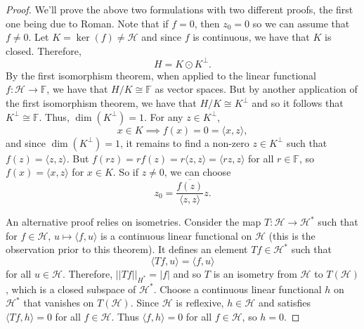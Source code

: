 \documentclass[psamsfonts]{amsart}
\theoremstyle{definition}
\theoremstyle{remark}
\numberwithin{equation}{section}
\begin{document}
\begin{proof}
We'll prove the above two formulations with two different proofs, the first one being due to Roman. Note that if $f = 0$, then $z_0 = 0$ so we can assume that $f \neq 0$. Let $K = \ker (f) \neq \mathcal{H}$ and since $f$ is continuous, we have that $K$ is closed. Therefore, 
$$H = K \odot K^{\perp}. $$
By the first isomorphism theorem, when applied to the linear functional $f : \mathcal{H} \rightarrow \mathbb{F}$, we have that $H/K \cong \mathbb{F}$ as vector spaces. But by another application of the first isomorphism theorem, we have that $H/K \cong K^{\perp}$ and so it follows that $K^{\perp} \cong \mathbb{F}.$ Thus, $\dim (K^{\perp}) = 1.$ For any $z \in K^{\perp}$, 
$$x \in K \implies f(x) = 0 = \langle x, z \rangle, $$
and since $\dim (K^{\perp}) = 1$, it remains to find a non-zero $z \in K^{\perp}$ such that $f(z) = \langle z, z \rangle$. But $f(rz) = rf(z) = r\langle z ,z \rangle = \langle rz , z \rangle$ for all $r \in \mathbb{F}$, so $f(x) = \langle x, z\rangle$ for $x \in K$. So if $z \neq 0$, we can choose 
$$z_0 = \frac{\overline{f(z)}}{\langle z, z \rangle} z. $$

An alternative proof relies on isometries. Consider the map $T: \mathcal{H} \rightarrow \mathcal{H}^*$ such that for $f \in \mathcal{H}$, $u \mapsto \langle f, u \rangle $ is a continuous linear functional on $\mathcal{H}$ (this is the observation prior to this theorem). It defines an element $Tf \in \mathcal{H}^*$ such that 
$$\langle Tf, u \rangle = \langle f, u \rangle $$
for all $u \in \mathcal{H}.$ Therefore, $||Tf||_{H^*} = |f|$ and so $T$ is an isometry from $\mathcal{H}$ to $T(\mathcal{H})$, which is a closed subspace of $\mathcal{H}^*$. Choose a continuous linear functional $h$ on $\mathcal{H}^*$ that vanishes on $T(\mathcal{H})$. Since $\mathcal{H}$ is reflexive, $h \in \mathcal{H}$ and satisfies $\langle Tf, h \rangle = 0$ for all $f \in \mathcal{H}$. Thus $\langle f, h \rangle = 0$ for all $f \in \mathcal{H}$, so $h = 0$.
\end{proof}
\end{document}
